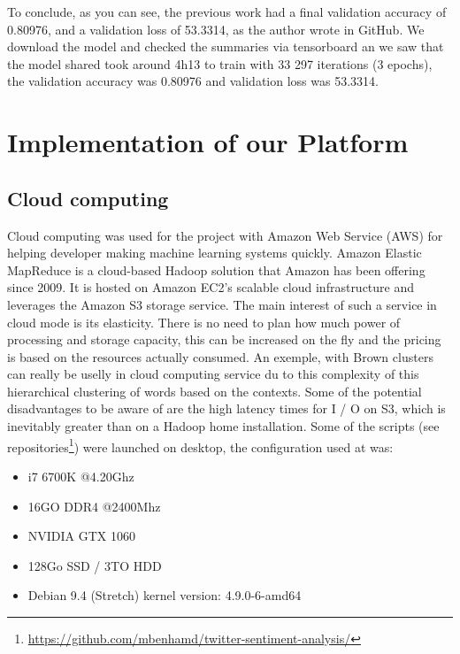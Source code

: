 \documentclass{acmtog} %
\begin{document}
\begin{table}[H]
\label{tab:valid_loss_b}
\end{table}

To conclude, as you can see, the previous work had a final validation accuracy of 0.80976, and a validation loss of 53.3314, as the author wrote in GitHub. We download the model and checked the summaries via tensorboard an we saw that the model shared took around 4h13 to train with 33 297 iterations (3 epochs), the validation accuracy was 0.80976 and validation loss was 53.3314.

\section{Implementation of our Platform}

\subsection{Cloud computing}
\label{sec:cloud}

Cloud computing was used for the project with Amazon Web Service (AWS) for helping developer making machine learning systems quickly. 
Amazon Elastic MapReduce is a cloud-based Hadoop solution that Amazon has been offering since 2009. It is hosted on Amazon EC2's scalable cloud infrastructure and leverages the Amazon S3 storage service. The main interest of such a service in cloud mode is its elasticity. There is no need to plan how much power of processing and storage capacity, this can be increased on the fly and the pricing is based on the resources actually consumed. An exemple, with Brown clusters can really be uselly \cite{Marquez16} in cloud computing service du to this complexity of this hierarchical clustering of words based on the contexts.
Some of the potential disadvantages to be aware of are the high latency times for I / O on S3, which is inevitably greater than on a Hadoop home installation. Some of the scripts (see repositories\footnote{\url{https://github.com/mbenhamd/twitter-sentiment-analysis/}}) were launched on desktop, the configuration used at was:
\begin{itemize}
\item  i7 6700K @4.20Ghz
\item  16GO DDR4 @2400Mhz
\item  NVIDIA GTX 1060
\item  128Go SSD / 3TO HDD
\item  Debian 9.4 (Stretch) kernel version: 4.9.0-6-amd64
\end{itemize}
\end{document}
